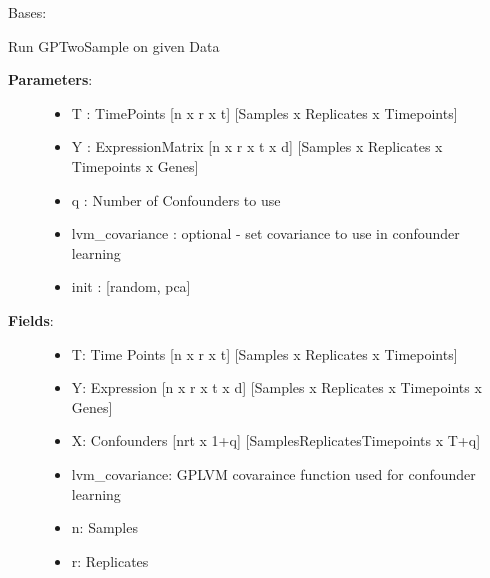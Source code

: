 \documentclass[letterpaper,10pt]{sphinxmanual}
\begin{document}
\begin{fulllineitems}
\label{base:gptwosample.confounder.confounder.TwoSampleConfounder}
Bases: {\hyperref[base:gptwosample.twosample.twosample.TwoSample]{}}

Run GPTwoSample on given Data
\begin{description}
\item[{\textbf{Parameters}:}] \leavevmode\begin{itemize}
\item {} 
T : TimePoints {[}n x r x t{]}    {[}Samples x Replicates x Timepoints{]}

\item {} 
Y : ExpressionMatrix {[}n x r x t x d{]}      {[}Samples x Replicates x Timepoints x Genes{]}

\item {} 
q : Number of Confounders to use

\item {} 
lvm\_covariance : optional - set covariance to use in confounder learning

\item {} 
init : {[}random, pca{]}

\end{itemize}

\item[{\textbf{Fields}:}] \leavevmode\begin{itemize}
\item {} 
T: Time Points {[}n x r x t{]} {[}Samples x Replicates x Timepoints{]}

\item {} 
Y: Expression {[}n x r x t x d{]} {[}Samples x Replicates x Timepoints x Genes{]}

\item {} 
X: Confounders {[}nrt x 1+q{]} {[}SamplesReplicatesTimepoints x T+q{]}

\item {} 
lvm\_covariance: GPLVM covaraince function used for confounder learning

\item {} 
n: Samples

\item {} 
r: Replicates


\end{itemize}
\end{description}
\end{fulllineitems}
\end{document}

